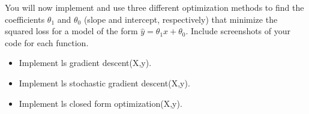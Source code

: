 \documentclass[12pt, letterpaper]{article}
\newenvironment{subsubproblem}[1]{%
  \begin{sspb}{#1}
    }{
  \end{sspb}
}
\begin{document}
\begin{subproblem}{}
    You will now implement and use three different optimization methods to find the coefficients
$\theta_1$ and $\theta_0$ (slope and intercept, respectively) that minimize the squared loss for a model of the form
$\hat{y} = \theta_1x + \theta_0$. Include screenshots of your code for each function.
\end{subproblem}
\begin{subsubproblem}{}
    \begin{itemize}
        \item Implement ls gradient descent(X,y).
        \item Implement ls stochastic gradient descent(X,y).
        \item Implement ls closed form optimization(X,y).
    \end{itemize}
\end{subsubproblem}
\end{document}
